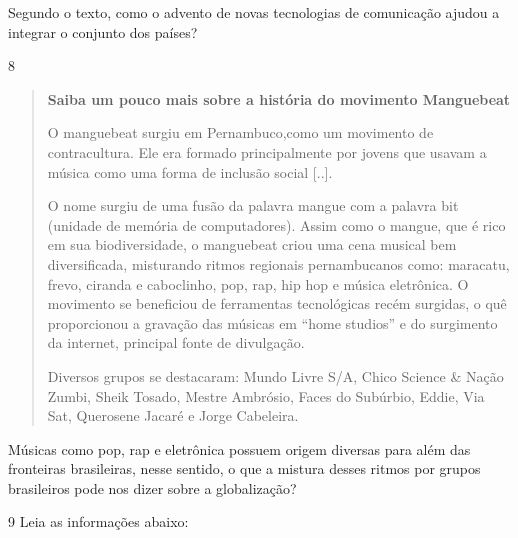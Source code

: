 Segundo o texto, como o advento de novas tecnologias de comunicação
ajudou a integrar o conjunto dos países?



\num{8}

\begin{quote}
\textbf{Saiba um pouco mais sobre a história do movimento Manguebeat}

O manguebeat surgiu em Pernambuco,como um movimento de
contracultura. Ele era formado principalmente por jovens que usavam a
música como uma forma de inclusão social {[}..{]}.

O nome surgiu de uma fusão da palavra mangue com a palavra bit
(unidade de memória de computadores). Assim como o mangue, que é rico em
sua biodiversidade, o manguebeat criou uma cena musical bem
diversificada, misturando ritmos regionais pernambucanos como: maracatu,
frevo, ciranda e caboclinho, pop, rap, hip hop e música eletrônica. O
movimento se beneficiou de ferramentas tecnológicas recém surgidas, o
quê proporcionou a gravação das músicas em ``home studios'' e do
surgimento da internet, principal fonte de divulgação.

Diversos grupos se destacaram: Mundo Livre S/A, Chico Science \&
Nação Zumbi, Sheik Tosado, Mestre Ambrósio, Faces do Subúrbio, Eddie,
Via Sat, Querosene Jacaré e Jorge Cabeleira.

\end{quote}

Músicas como pop, rap e eletrônica possuem origem diversas para além das
fronteiras brasileiras, nesse sentido, o que a mistura desses ritmos por
grupos brasileiros pode nos dizer sobre a globalização?



\num{9} Leia as informações abaixo:


